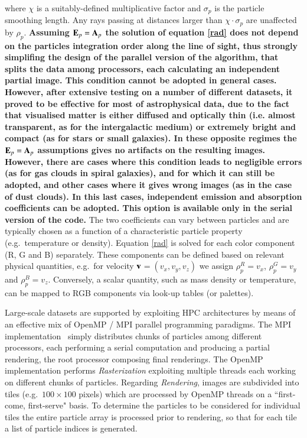 \documentclass[preprint,5pt]{elsarticle}
\begin{document}
\begin{itemize}
where $\chi$ is a suitably-defined multiplicative factor and $\sigma_p$ is the particle smoothing length. Any rays passing at distances larger than $\chi\cdot\sigma_p$ are unaffected by $\rho_p$. 
{\bf Assuming ${\bf E}_p = {\bf A}_p$ the solution of equation \eqref{rad} does not depend on the particles integration 
order along the line of sight, thus strongly simplifing the design of the parallel 
version of the algorithm, that splits the data among processors, each calculating an independent partial image. 
This condition cannot be adopted in general cases. However, after extensive testing on a number of different datasets,   
it proved to be effective for most of astrophysical data, due to the fact that visualised matter is either diffused and optically thin 
(i.e. almost transparent, as for the intergalactic medium) or extremely bright and compact (as for stars or small galaxies).
In these opposite regimes the ${\bf E}_p = {\bf A}_p$ assumptions gives no artifacts on the resulting images. 
However, there are cases where this condition leads to negligible errors (as for gas clouds in spiral galaxies), and
for which it can still be adopted, and other cases where it gives wrong images (as in the case of dust clouds). 
In this last cases, independent emission and absorption coefficients can be adopted. This option is available
only in the serial version of the code. }
The two coefficients can vary between particles and are typically chosen as a function of a characteristic
particle property (e.g.\ temperature or density).
Equation \eqref{rad} is solved for each color component (R, G and B) separately. These components can be defined based on relevant physical quantities, e.g.\ for velocity $\bf v$$=(v_x, v_y, v_z)$ we assign $\rho_p^{R}=v_x$, $\rho_p^{G}=v_y$ and $\rho_p^{B}=v_z$. Conversely, a scalar quantity, such as mass density or temperature, can be mapped to RGB components via look-up tables (or palettes). 
\end{itemize}
Large-scale datasets are supported by exploiting HPC architectures by means of an effective mix of OpenMP / MPI parallel programming paradigms. The MPI implementation~\cite{jin:high-performance}  simply distributes chunks of particles among different processors, each performing a serial computation and producing a partial rendering, the root processor composing final renderings. The OpenMP implementation performs {\it Rasterization} exploiting multiple threads each working on different chunks of particles. Regarding {\it Rendering}, images are subdivided into tiles (e.g.\ $100 \times 100$ pixels) which are processed by OpenMP threads on a ``first-come, first-serve" basis. To determine the particles to be considered for individual tiles the entire particle array is processed prior to rendering, so that for each tile a list of particle indices is generated.
\end{document}

